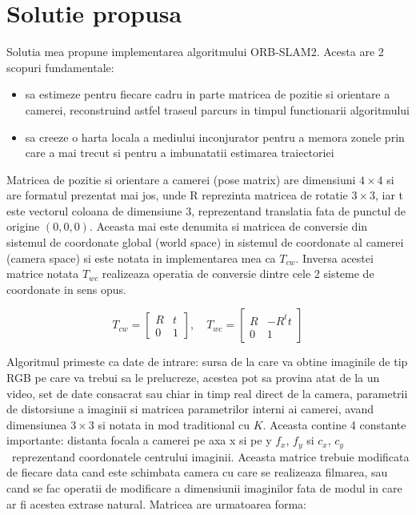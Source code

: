 \documentclass[12pt,a4paper]{report}
\begin{document}
\chapter{Solutie propusa}
Solutia mea propune implementarea algoritmului ORB-SLAM2. Acesta are 2 scopuri 
fundamentale:
\begin{itemize}
    \item sa estimeze pentru fiecare cadru in parte matricea de pozitie si orientare
a camerei, reconstruind astfel traseul parcurs in timpul functionarii algoritmului  
    \item sa creeze o harta locala a mediului inconjurator pentru a memora zonele
prin care a mai trecut si pentru a imbunatatii estimarea traiectoriei  
\end{itemize}
Matricea de pozitie si orientare a camerei (pose matrix) are dimensiuni $ 4 \times 4 $ si are 
formatul prezentat mai jos, unde R reprezinta matricea de rotatie $ 3 \times 3 $, iar t este
vectorul coloana de dimensiune 3, reprezentand translatia fata de punctul de origine
\( (0, 0, 0)\). Aceasta mai este denumita si matricea de conversie din sistemul de 
coordonate global (world space) in sistemul de coordonate al camerei (camera space) si 
este notata in implementarea mea ca \( T_{cw} \). Inversa acestei matrice notata
\(T_{wc} \) realizeaza operatia de conversie dintre cele 2 sisteme de coordonate 
in sens opus.

\begin{equation}
T_{cw} = 
\begin{bmatrix}
R & t \\
0 & 1
\end{bmatrix}, \quad{}
T_{wc} = 
\begin{bmatrix}
R & -R^{t}t \\
0 & 1
\end{bmatrix}
\end{equation}

Algoritmul primeste ca date de intrare: sursa de la care va obtine imaginile de tip
RGB pe care va trebui sa le prelucreze, acestea pot sa provina atat de la un video,
set de date consacrat sau chiar in timp real direct de la camera, parametrii de 
distorsiune a imaginii si matricea parametrilor interni ai camerei, avand dimensiunea 
$ 3 \times 3 $ si notata in mod traditional cu \(K\). Aceasta contine 4 constante importante: 
distanta focala a camerei pe axa x si pe y \(f_x\), \(f_y\) si \(c_x\), \(c_y\) \
reprezentand coordonatele centrului imaginii. Aceasta matrice trebuie modificata de 
fiecare data cand este schimbata camera cu care se realizeaza filmarea, sau cand se 
fac operatii de modificare a dimensiunii imaginilor fata de modul in care ar fi 
acestea extrase natural. Matricea are urmatoarea forma:
   
\end{document}
